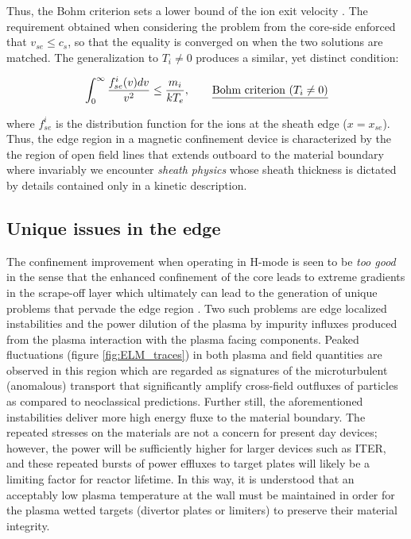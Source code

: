 \documentclass[11pt,titlepage]{report}
\begin{document}
\noindent Thus, the Bohm criterion sets a lower bound of the ion exit velocity \cite{Stangeby}. The requirement obtained when considering the problem from the core-side enforced that $v_{se} \leq c_s$, so that the equality is converged on when the two solutions are matched. The generalization to $T_i \neq 0$ produces a similar, yet distinct condition:

\begin{equation}
\int_0^{\infty} \frac{f_{se}^i(v) dv}{v^2} \leq \frac{m_i}{kT_e} , \qquad \text{\underline{Bohm criterion ($T_i \neq 0$)}\label{eq:Bohm_criterion_kinetic}}
\end{equation}

\noindent where $f_{se}^i$ is the distribution function for the ions at the sheath edge ($x = x_{se}$). Thus, the edge region in a magnetic confinement device is characterized by the the region of open field lines that extends outboard to the material boundary where invariably we encounter \emph{sheath physics} whose sheath thickness is dictated by details contained only in a kinetic description.




\subsection{Unique issues in the edge}\label{subsec:Unique_physics_in_the_edge}

\indent \indent The confinement improvement when operating in H-mode is seen to be \emph{too good} in the sense that the enhanced confinement of the core leads to extreme gradients in the scrape-off layer which ultimately can lead to the generation of unique problems that pervade the edge region \cite{Finken}. Two such problems are edge localized instabilities and the power dilution of the plasma by impurity influxes produced from the plasma interaction with the plasma facing components. Peaked fluctuations (figure \ref{fig:ELM_traces}) in both plasma and field quantities are observed in this region which are regarded as signatures of the microturbulent (anomalous) transport that significantly amplify cross-field outfluxes of particles as compared to neoclassical predictions. Further still, the aforementioned instabilities deliver more high energy fluxe to the material boundary. The repeated stresses on the materials are not a concern for present day devices; however, the power will be sufficiently higher for larger devices such as ITER, and these repeated bursts of power effluxes to target plates will likely be a limiting factor for reactor lifetime. In this way, it is understood that an acceptably low plasma temperature at the wall must be maintained in order for the plasma wetted targets (divertor plates or limiters) to preserve their material integrity.
\end{document}
